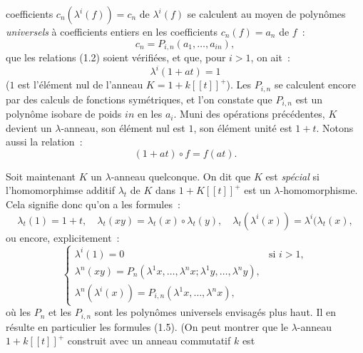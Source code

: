 coefficients $c_n(\lambda^i(f))=c_n\text{ de }\lambda^i(f)$ se calculent au moyen de polynômes \emph{universels} à coefficients entiers en les coefficients $c_n(f)=a_n$ de $f$~:
\begin{equation}\tag{1.8}
c_n=P_{i,n}(a_1,\ldots,a_{in}),
\end{equation}
que les relations (1.2) soient vérifiées, et que, pour $i>1$, on ait~:
\begin{equation}\tag{1.9}
\lambda^i(1+at)=1
\end{equation}
($1$ est l'élément nul de l'anneau $K=1+k[[t]]^+$). Les $P_{i,n}$ se calculent encore par des calculs de fonctions symétriques, et l'on constate que $P_{i,n}$ est un polynôme isobare de poids $in$ en les $a_i$. Muni des opérations précédentes, $K$ devient un $\lambda$-anneau, son élément nul est $1$, son élément unité est $1+t$. Notons aussi la relation~:
\begin{equation}\tag{1.7 bis}
(1+at)\circ f=f(at).
\end{equation}

Soit maintenant $K$ un $\lambda$-anneau quelconque. On dit que $K$ est \emph{spécial} si l'homomorphimse additif $\lambda_t$ de $K$ dans $1+K[[t]]^+$ est un $\lambda$-homomorphisme. Cela signifie donc qu'on a les formules~:
\begin{equation}\tag{1.10}
\lambda_t(1)=1+t,\quad
\lambda_t(xy)=\lambda_t(x)\circ\lambda_t(y),\quad
\lambda_t(\lambda^i(x))=\lambda^i(\lambda_t(x),
\end{equation}
ou encore, explicitement~:
\begin{equation}\tag{1.11}
\begin{cases}
\lambda^i(1)=0 & \text{si }i>1,\\
\lambda^n(xy)=P_n(\lambda^1x,\ldots,\lambda^n x;\lambda^1y,\ldots,\lambda^n y),\\
\lambda^n(\lambda^i(x))=P_{i,n}(\lambda^1x,\ldots,\lambda^n x),
\end{cases}
\end{equation}
où les $P_n$ et les $P_{i,n}$ sont les polynômes universels envisagés plus haut. Il en résulte en particulier les formules (1.5). (On peut montrer que le $\lambda$-anneau $1+k[[t]]^+$ construit avec un anneau commutatif $k$ est

